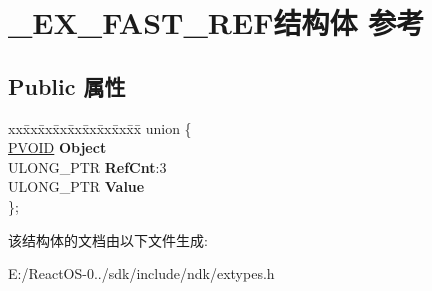 \hypertarget{struct___e_x___f_a_s_t___r_e_f}{}\section{\+\_\+\+E\+X\+\_\+\+F\+A\+S\+T\+\_\+\+R\+E\+F结构体 参考}
\label{struct___e_x___f_a_s_t___r_e_f}
\subsection*{Public 属性}
\begin{DoxyCompactItemize}
\item 
\mbox{\label{struct___e_x___f_a_s_t___r_e_f_ae29990028a20c71b0ec820bd6df9540c}} 
\begin{tabbing}
xx\=xx\=xx\=xx\=xx\=xx\=xx\=xx\=xx\=\kill
union \{\\
\>\hyperlink{interfacevoid}{PVOID} {\bfseries Object}\\
\>ULONG\_PTR {\bfseries RefCnt}:3\\
\>ULONG\_PTR {\bfseries Value}\\
\}; \\

\end{tabbing}\end{DoxyCompactItemize}


该结构体的文档由以下文件生成\+:\begin{DoxyCompactItemize}
\item 
E\+:/\+React\+O\+S-\/0../sdk/include/ndk/extypes.\+h\end{DoxyCompactItemize}
